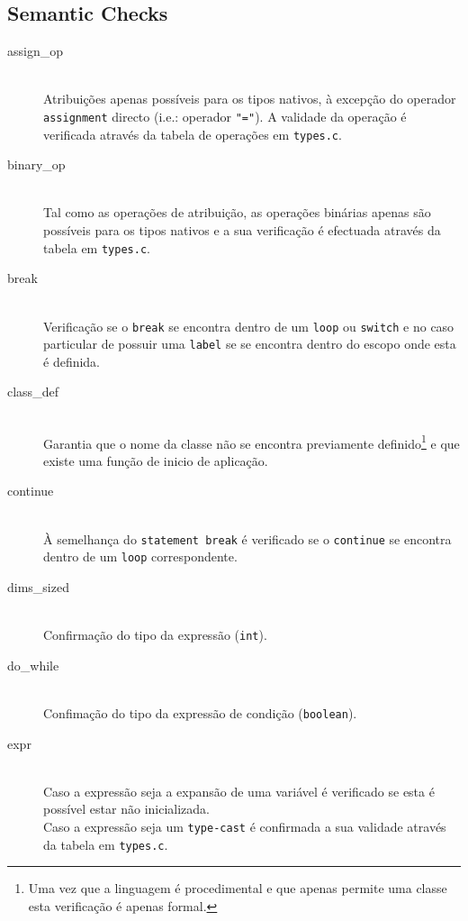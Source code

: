 \documentclass[a4paper]{article}
\begin{document}
\cleardoublepage
\subsection{Semantic Checks}
\begin{description}
	\item [assign\_op] \hfill \\
		Atribuições apenas possíveis para os tipos nativos, à excepção do operador \texttt{assignment} directo (i.e.: operador \texttt{"="}).
		A validade da operação é verificada através da tabela de operações em \texttt{types.c}.

	\item [binary\_op] \hfill \\
		Tal como as operações de atribuição, as operações binárias apenas são possíveis para os tipos nativos e a sua verificação
		é efectuada através da tabela em \texttt{types.c}.

	\item [break] \hfill \\
		Verificação se o \texttt{break} se encontra dentro de um \texttt{loop} ou \texttt{switch}
		e no caso particular de possuir uma \texttt{label} se se encontra dentro do escopo onde esta é definida.

	\item [class\_def] \hfill \\
		Garantia que o nome da classe não se encontra previamente definido\footnote[1]{Uma vez que a linguagem é procedimental e que apenas permite uma classe esta verificação é apenas formal.} e que existe uma função
		de inicio de aplicação.

	\item [continue] \hfill \\
		À semelhança do \texttt{statement break} é verificado se o \texttt{continue} se encontra dentro de um \texttt{loop} correspondente.

	\item [dims\_sized] \hfill \\
		Confirmação do tipo da expressão (\texttt{int}).

	\item [do\_while] \hfill \\
		Confimação do tipo da expressão de condição (\texttt{boolean}).

	\item [expr] \hfill \\
		Caso a expressão seja a expansão de uma variável é verificado se esta é possível estar não inicializada. \\
		Caso a expressão seja um \texttt{type-cast} é confirmada a sua validade através da tabela em \texttt{types.c}.


\end{description}
\end{document}
